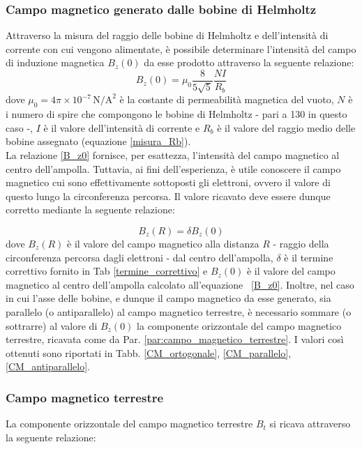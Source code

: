 \documentclass[]{article}
\begin{document}
    \subsubsection{Campo magnetico generato dalle bobine di Helmholtz}
    Attraverso la misura del raggio delle bobine di Helmholtz e dell'intensità di corrente con cui vengono alimentate, è possibile determinare l'intensità del campo di induzione magnetica $B_z(0)$ da esse prodotto attraverso la seguente relazione:
    \begin{equation}
        \label{B_z0}
        B_z (0) = \mu _0 \frac{8}{5\sqrt{5}} \frac{NI}{R_b}
    \end{equation} 
    dove $\mu _0 = 4\pi \times 10^{-7} \, \text{N/A}^2 $ è la costante di permeabilità magnetica del vuoto, $N$ è i numero di spire che compongono le bobine di Helmholtz - pari a 130 in questo caso -, $I$ è il valore dell'intensità di corrente e $R_b$ è il valore del raggio medio delle bobine assegnato (equazione \ref{misura_Rb}). \\
    La relazione \ref{B_z0} fornisce, per esattezza, l'intensità del campo magnetico al centro dell'ampolla. Tuttavia, ai fini dell'esperienza, è utile conoscere il campo magnetico cui sono effettivamente sottoposti gli elettroni, ovvero il valore di questo lungo la circonferenza percorsa. Il valore ricavato deve essere dunque corretto mediante la seguente relazione:


    \begin{equation}
        \label{B_zR}
        B_z(R) = \delta B_z(0)
    \end{equation}
    dove $B_z(R) $ è il valore del campo magnetico alla distanza $ R $ - raggio della circonferenza percorsa dagli elettroni - dal centro dell'ampolla, $\delta$ è il termine correttivo fornito in Tab \ref{termine_correttivo} e $B_z(0)$ è il valore del campo magnetico al centro dell'ampolla calcolato all'equazione ~\ref{B_z0}.
    Inoltre, nel caso in cui l'asse delle bobine, e dunque il campo magnetico da esse generato, sia parallelo (o antiparallelo) al campo magnetico terrestre, è necessario sommare (o sottrarre) al valore di $B_z(0)$ la componente orizzontale del campo magnetico terrestre, ricavata come da Par. \ref{par:campo_magnetico_terrestre}. I valori così ottenuti sono riportati in Tabb. \ref{CM_ortogonale}, \ref{CM_parallelo}, \ref{CM_antiparallelo}.

    \subsubsection{Campo magnetico terrestre}
    La componente orizzontale del campo magnetico terrestre $B_t $ si ricava attraverso la seguente relazione:
\end{document}
